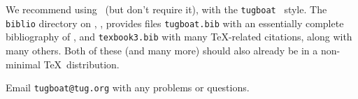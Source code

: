 \documentclass{ltugboat}
\begin{document}
We recommend using \BibTeX\ (but don't require it), with the
\texttt{tugboat} \BibTeX\ style. The \texttt{biblio} directory on \CTAN,
, provides files \texttt{tugboat.bib} with
an essentially complete bibliography of \TUB, and \texttt{texbook3.bib}
with many \TeX-related citations, along with many others. Both of these
(and many more) should also already be in a non-minimal \TeX\
distribution.

Email \verb|tugboat@tug.org| with any problems or questions.


\nocite{book-minimal}      %

\makesignature
\end{document}

